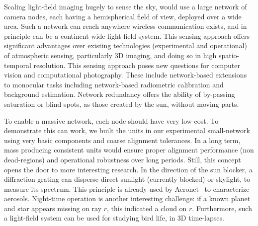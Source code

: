 \documentclass[runningheads]{llncs}
\begin{document}
Scaling light-field imaging hugely to sense the sky, would use  a large network of camera nodes, each having a hemispherical field of view, deployed over a wide area. Such a network can reach anywhere wireless communication exists, and in principle can be a continent-wide light-field system. This sensing approach offers significant advantages over existing technologies (experimental and operational) of atmospheric sensing, particularly  3D imaging, and doing so in high spatio-temporal resolution. This sensing approach poses new questions for computer vision and computational photography. These include network-based extensions to monocular tasks including network-based radiometric calibration and background estimation. Network redundancy offers the ability of by-passing saturation or blind spots, as those created by the sun, without moving parts.

To enable a massive network, each node should have very low-cost. To demonstrate this can work, we built the units in our experimental small-network using very basic components and coarse alignment tolerances. In a long term, mass producing consistent units would ensure proper alignment performance (non dead-regions) and operational robustness over long periods. Still, this concept opens the door to more interesting research. In the direction of the sun blocker, a diffraction grating can disperse direct sunlight (currently blocked) or skylight, to measure its spectrum. This principle is already used by Aeronet~\cite{Holben1998} to characterize aerosols. Night-time operation is another interesting challenge: if a known planet and star appears missing on ray $r$, this indicated a cloud on $r$. Furthermore, such a light-field system can be used for studying bird life, in 3D time-lapses.









\end{document}
